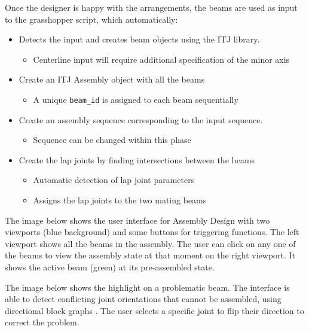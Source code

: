 Once the designer is happy with the arrangements, the beams are used as input to the grasshopper script, which automatically:
\begin{itemize}
    \item Detects the input and creates beam objects using the ITJ library.
    \begin{itemize}
        \item Centerline input will require additional specification of the minor axis
    \end{itemize}
    \item Create an ITJ Assembly object with all the beams
    \begin{itemize}
        \item A unique \verb|beam_id| is assigned to each beam sequentially
    \end{itemize}
    \item Create an assembly sequence corresponding to the input sequence.
    \begin{itemize}
        \item Sequence can be changed within this phase
    \end{itemize}
    \item Create the lap joints by finding intersections between the beams
    \begin{itemize}
        \item Automatic detection of lap joint parameters
        \item Assigns the lap joints to the two mating beams
    \end{itemize}
\end{itemize}
The image below shows the user interface for Assembly Design with two viewports (blue background) and some buttons for triggering functions. The left viewport shows all the beams in the assembly. The user can click on any one of the beams to view the assembly state at that moment on the right viewport. It shows the active beam (green) at its pre-assembled state.

The image below shows the highlight on a problematic beam. The interface is able to detect conflicting joint orientations that cannot be assembled, using directional block graphs \parencite{wilsonGeometricAssemblyPlanning1992b}. The user selects a specific joint to flip their direction to correct the problem.


